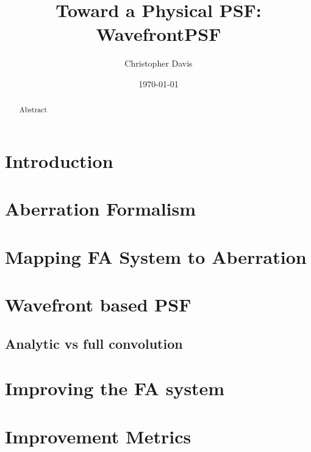\documentclass[aas_macros,preprint]{aastex}%
\begin{document}
\title{ Toward a Physical PSF: WavefrontPSF }
\author{ Christopher Davis }
\affil{}
\email{}
\date{ \today }

\maketitle

\begin{abstract}
  Abstract
\end{abstract}

\tableofcontents


\todototoc
\listoftodos

\section{Introduction}

\section{Aberration Formalism}

\section{Mapping FA System to Aberration}

\section{Wavefront based PSF}

\subsection{Analytic vs full convolution}

\section{Improving the FA system}

\section{Improvement Metrics}
\end{document}
